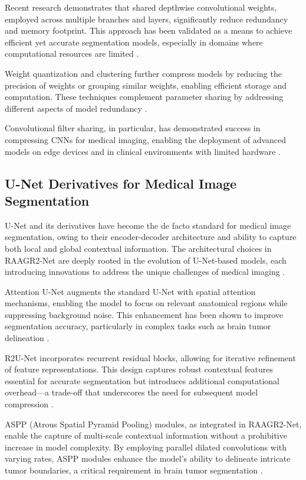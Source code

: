 \documentclass[12pt,a4paper]{article}
\begin{document}
Recent research demonstrates that shared depthwise convolutional weights, employed across multiple branches and layers, significantly reduce redundancy and memory footprint. This approach has been validated as a means to achieve efficient yet accurate segmentation models, especially in domains where computational resources are limited \cite{Jeong2021, Wang2023Review}.

Weight quantization and clustering further compress models by reducing the precision of weights or grouping similar weights, enabling efficient storage and computation. These techniques complement parameter sharing by addressing different aspects of model redundancy \cite{Jeong2021, Ragab2024}.

Convolutional filter sharing, in particular, has demonstrated success in compressing CNNs for medical imaging, enabling the deployment of advanced models on edge devices and in clinical environments with limited hardware \cite{Jeong2021, Wang2023Review}.

\subsection{U-Net Derivatives for Medical Image Segmentation}

U-Net and its derivatives have become the de facto standard for medical image segmentation, owing to their encoder-decoder architecture and ability to capture both local and global contextual information. The architectural choices in RAAGR2-Net are deeply rooted in the evolution of U-Net-based models, each introducing innovations to address the unique challenges of medical imaging \cite{Abidin2024, Wang2023Review}.

Attention U-Net augments the standard U-Net with spatial attention mechanisms, enabling the model to focus on relevant anatomical regions while suppressing background noise. This enhancement has been shown to improve segmentation accuracy, particularly in complex tasks such as brain tumor delineation \cite{Oktay2018AttentionUNet, Abidin2024}.

R2U-Net incorporates recurrent residual blocks, allowing for iterative refinement of feature representations. This design captures robust contextual features essential for accurate segmentation but introduces additional computational overhead—a trade-off that underscores the need for subsequent model compression \cite{Alom2019R2UNet, Abidin2024}.

ASPP (Atrous Spatial Pyramid Pooling) modules, as integrated in RAAGR2-Net, enable the capture of multi-scale contextual information without a prohibitive increase in model complexity. By employing parallel dilated convolutions with varying rates, ASPP modules enhance the model's ability to delineate intricate tumor boundaries, a critical requirement in brain tumor segmentation \cite{Chen2018ASPP, Rehman2023RAAGR2}.
\end{document}
